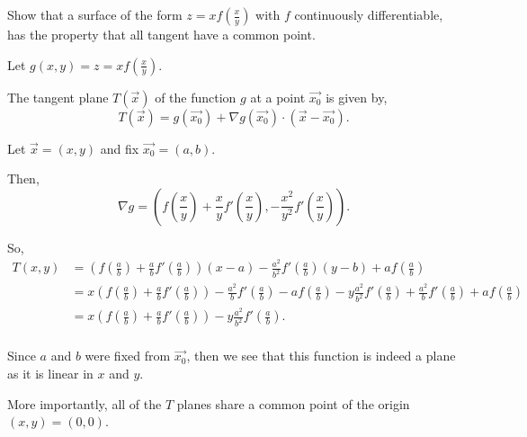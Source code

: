 \documentclass{article}
\begin{document}
  \begin{problem}
    Show that a surface of the form $z=xf(\frac{x}{y})$ with $f$ continuously differentiable, has the property that all tangent have a common point.
  \end{problem}

  Let $g(x,y)=z=xf(\frac{x}{y})$.

  The tangent plane $T(\vec{x})$ of the function $g$ at a point $\vec{x_0}$ is given by, \[
  T(\vec{x})=g(\vec{x_0})+\nabla g(\vec{x_0})\cdot (\vec{x}-\vec{x_0})
  .\] 

  Let $\vec{x}=(x,y)$ and fix $\vec{x_0}=(a,b)$.

  Then, \[
  \nabla g = \left(f\left(\frac{x}{y}\right)+\frac{x}{y}f'\left(\frac{x}{y}\right),-\frac{x^2}{y^2}f'\left(\frac{x}{y}\right)\right)
  .\] 

  So,
  \begin{align*}
    T(x,y)&= \left( f\left( \frac{a}{b} \right) +\frac{a}{b}f'\left( \frac{a}{b} \right)  \right)(x-a)-\frac{a^2}{b^2}f'\left( \frac{a}{b} \right)(y-b)+af\left( \frac{a}{b} \right)\\
    &= x\left(f\left( \frac{a}{b} \right)+\frac{a}{b}f'\left( \frac{a}{b} \right) \right)-\frac{a^2}{b}f'\left( \frac{a}{b} \right) -af\left( \frac{a}{b} \right) -y \frac{a^2}{b^2}f'\left( \frac{a}{b} \right)+\frac{a^2}{b}f'\left( \frac{a}{b} \right) + af\left( \frac{a}{b} \right)   \\
    &= x\left( f\left( \frac{a}{b} \right)+\frac{a}{b}f'\left( \frac{a}{b} \right)   \right) -y \frac{a^2}{b^2} f'\left( \frac{a}{b} \right). \\
  \end{align*}

  Since $a$ and $b$ were fixed from  $\vec{x_0}$, then we see that this function is indeed a plane as it is linear in $x$ and $y$. 

  More importantly, all of the $T$ planes share a common point of the origin $(x,y)=(0,0)$.
\end{document}
